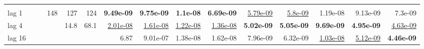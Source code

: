 \begin{table}[t]
\begin{tabular}{lrrrrrrrrrrrrrr}
\addlinespace
\multicolumn{15}{l}{\textit{VARX}} \\
\quad lag 1 &  &  & 148 & 127 & 124 & \textbf{9.49e-09} & \textbf{9.75e-09} & \textbf{1.1e-08} & \textbf{6.69e-09} & \underline{5.79e-09} & \underline{5.8e-09} & 1.19e-08 & 9.13e-09 & 7.3e-09 \\
\quad lag 4 &  &  &  & 14.8 & 68.1 & \underline{2.01e-08} & \underline{1.61e-08} & \underline{1.22e-08} & \underline{1.36e-08} & \textbf{5.02e-09} & \textbf{5.05e-09} & \textbf{9.69e-09} & \textbf{4.95e-09} & \underline{4.63e-09} \\
\quad lag 16 &  &  &  &  &  & 6.87 & 9.01e-07 & 1.38e-08 & 1.62e-08 & 7.96e-09 & 6.32e-09 & \underline{1.03e-08} & \underline{5.12e-09} & \textbf{4.46e-09} \\
\bottomrule
\end{tabular}
\end{table}